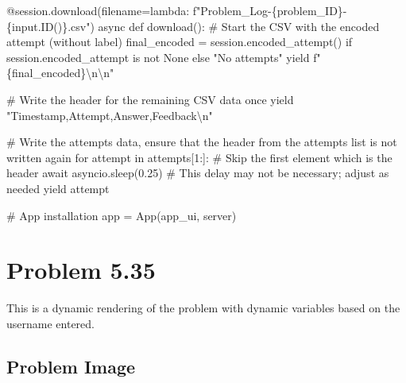 \documentclass[
  letterpaper,
  DIV=11,
  numbers=noendperiod]{scrreprt}
\newenvironment{Shaded}{\begin{snugshade}}{\end{snugshade}}
\newcommand{\NormalTok}[1]{\textcolor[rgb]{0.00,0.23,0.31}{#1}}
\begin{document}
\begin{Shaded}
\begin{Highlighting}[]
\NormalTok{    @session.download(filename=lambda: f"Problem\_Log{-}\{problem\_ID\}{-}\{input.ID()\}.csv")}
\NormalTok{    async def download():}
\NormalTok{        \# Start the CSV with the encoded attempt (without label)}
\NormalTok{        final\_encoded = session.encoded\_attempt() if session.encoded\_attempt is not None else "No attempts"}
\NormalTok{        yield f"\{final\_encoded\}\textbackslash{}n\textbackslash{}n"}
        
\NormalTok{        \# Write the header for the remaining CSV data once}
\NormalTok{        yield "Timestamp,Attempt,Answer,Feedback\textbackslash{}n"}
        
\NormalTok{        \# Write the attempts data, ensure that the header from the attempts list is not written again}
\NormalTok{        for attempt in attempts[1:]:  \# Skip the first element which is the header}
\NormalTok{            await asyncio.sleep(0.25)  \# This delay may not be necessary; adjust as needed}
\NormalTok{            yield attempt}


\NormalTok{\# App installation}
\NormalTok{app = App(app\_ui, server)}
\end{Highlighting}
\end{Shaded}

\chapter*{Problem 5.35}\label{problem-5.35}


This is a dynamic rendering of the problem with dynamic variables based
on the username entered.

\section*{Problem Image}\label{problem-image-48}

\end{document}

